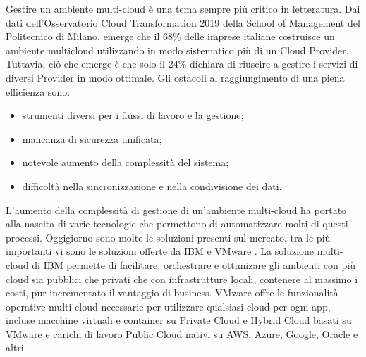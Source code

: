 Gestire un ambiente multi-cloud è una tema sempre più critico in letteratura. Dai dati dell'Osservatorio Cloud Transformation 2019 \cite{osservatorio} della School of Management del Politecnico di Milano, emerge che il 68\% delle imprese italiane costruisce un ambiente multicloud utilizzando in modo sistematico più di un Cloud Provider. Tuttavia, ciò che emerge è che solo il 24\% dichiara di riuscire a gestire i servizi di diversi Provider in modo ottimale. Gli ostacoli al raggiungimento di una piena efficienza sono:
\begin{itemize}
    \item strumenti diversi per i flussi di lavoro e la gestione;
    \item mancanza di sicurezza unificata;
    \item notevole aumento della complessità del sistema;
    \item difficoltà nella sincronizzazione e nella condivisione dei dati.
\end{itemize}
L'aumento della complessità di gestione di un'ambiente multi-cloud ha portato alla nascita di varie tecnologie  che permettono di automatizzare molti di questi processi. Oggigiorno sono molte le soluzioni presenti sul mercato, tra le più importanti vi sono le soluzioni offerte da IBM \cite{ibm} e VMware \cite{vmware}. La soluzione multi-cloud di IBM permette di facilitare, orchestrare e ottimizare gli ambienti con più cloud sia pubblici che privati che con infrastrutture locali, contenere al massimo i costi, pur incrementato il vantaggio di business. VMware offre le funzionalità operative multi-cloud necessarie per utilizzare qualsiasi cloud per ogni app, incluse macchine virtuali e container su Private Cloud e Hybrid Cloud basati su VMware e carichi di lavoro Public Cloud nativi su AWS, Azure, Google, Oracle e altri. 
